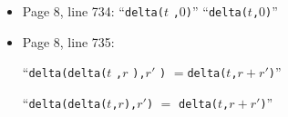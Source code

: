 \documentclass[12pt,onecolumn]{IEEEtranTIE}
\begin{document}
\begin{itemize}
\item Page 8, line 734: ``\verb|delta(|$t$ \verb|,|$0$\verb|)|'' \by
  ``\verb|delta(|$t$\verb|,|$0$\verb|)|''

\item Page 8, line 735:

``\verb|delta(delta(|$t$ \verb|,|$r$ \verb|),|$r'$ \verb|)|
  $=$\verb|delta(|$t$\verb|,|$r+r'$\verb|)|''

\by
  
``\verb|delta(delta(|$t$\verb|,|$r$\verb|),|$r'$\verb|)| $=$
\verb|delta(|$t$\verb|,|$r+r'$\verb|)|''

\end{itemize}
\end{document}
